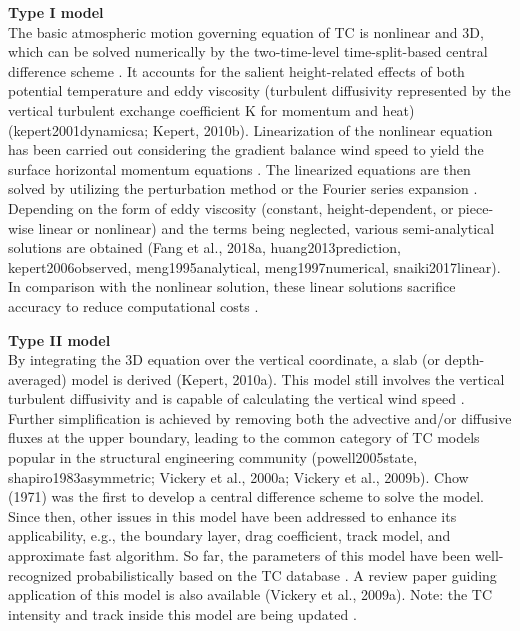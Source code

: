 \noindent\textbf{Type I model} \\The basic atmospheric motion governing equation of TC is nonlinear and 3D, which can be solved numerically by the two-time-level time-split-based central difference scheme \citep{kepert2001dynamicsa,kepert2011choosing}. It accounts for the salient height-related effects of both potential temperature and eddy viscosity (turbulent diffusivity represented by the vertical turbulent exchange coefficient K for momentum and heat) (kepert2001dynamicsa; Kepert, 2010b). Linearization of the nonlinear equation has been carried out considering the gradient balance wind speed to yield the surface horizontal momentum equations \citep{kepert2001dynamics}. The linearized equations are then solved by utilizing the perturbation method \citep{meng1995analytical} or the Fourier series expansion \citep{kepert2001dynamics}. Depending on the form of eddy viscosity (constant, height-dependent, or piece-wise linear or nonlinear) and the terms being neglected, various semi-analytical solutions are obtained (Fang et al., 2018a, huang2013prediction, kepert2006observed, meng1995analytical, meng1997numerical, snaiki2017linear). In comparison with the nonlinear solution, these linear solutions sacrifice accuracy to reduce computational costs \citep{kepert2014reply}. 
\newline

\noindent\textbf{Type II model} \\By integrating the 3D equation over the vertical coordinate, a slab (or depth-averaged) model is derived (Kepert, 2010a). This model still involves the vertical turbulent diffusivity and is capable of calculating the vertical wind speed \citep{langousis2008extreme, smith1968surface, smith2008simple} . Further simplification is achieved by removing both the advective and/or diffusive fluxes at the upper boundary, leading to the common category of TC models popular in the structural engineering community (powell2005state, shapiro1983asymmetric; Vickery et al., 2000a; Vickery et al., 2009b). Chow (1971) was the first to develop a central difference scheme to solve the model. Since then, other issues in this model have been addressed to enhance its applicability, e.g., the boundary layer, drag coefficient, track model, and approximate fast algorithm. So far, the parameters of this model have been well-recognized probabilistically based on the TC database \citep{vickery2008statistical}. A review paper guiding application of this model is also available (Vickery et al., 2009a). Note: the TC intensity and track inside this model are being updated \citep{mudd2015development, vickery2010synthetic}. 
\newline

